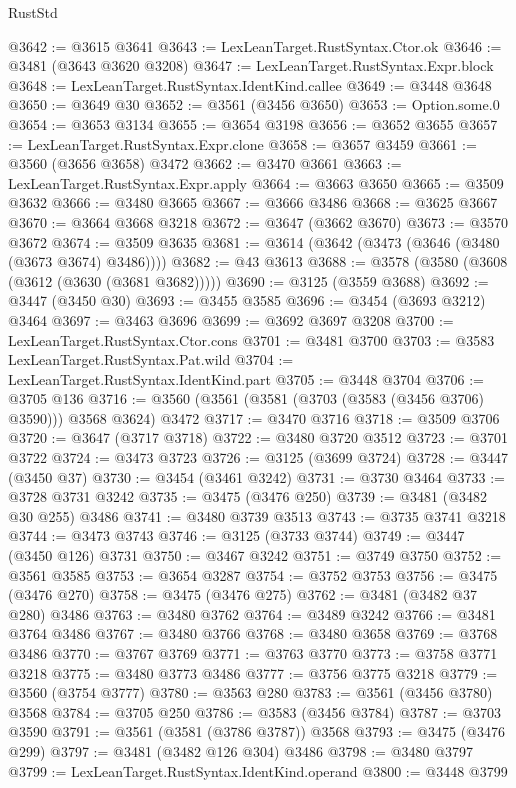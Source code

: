 \begin{lexlean}{RustStd}
\begin{coremodule}
{\begin{coremodule}
{{{{{{{{{{{{{{{{{{{{{{{{{{{{{{{{{{{{{{{{{{{{{@3642 := @3615 @3641
@3643 := LexLeanTarget.RustSyntax.Ctor.ok
@3646 := @3481 (@3643 @3620 @3208)
@3647 := LexLeanTarget.RustSyntax.Expr.block
@3648 := LexLeanTarget.RustSyntax.IdentKind.callee
@3649 := @3448 @3648
@3650 := @3649 @30
@3652 := @3561 (@3456 @3650)
@3653 := Option.some.{0}
@3654 := @3653 @3134
@3655 := @3654 @3198
@3656 := @3652 @3655
@3657 := LexLeanTarget.RustSyntax.Expr.clone
@3658 := @3657 @3459
@3661 := @3560 (@3656 @3658) @3472
@3662 := @3470 @3661
@3663 := LexLeanTarget.RustSyntax.Expr.apply
@3664 := @3663 @3650
@3665 := @3509 @3632
@3666 := @3480 @3665
@3667 := @3666 @3486
@3668 := @3625 @3667
@3670 := @3664 @3668 @3218
@3672 := @3647 (@3662 @3670)
@3673 := @3570 @3672
@3674 := @3509 @3635
@3681 := @3614 (@3642 (@3473 (@3646 (@3480 (@3673 @3674) @3486))))
@3682 := @43 @3613
@3688 := @3578 (@3580 (@3608 (@3612 (@3630 (@3681 @3682)))))
@3690 := @3125 (@3559 @3688)
@3692 := @3447 (@3450 @30)
@3693 := @3455 @3585
@3696 := @3454 (@3693 @3212) @3464
@3697 := @3463 @3696
@3699 := @3692 @3697 @3208
@3700 := LexLeanTarget.RustSyntax.Ctor.cons
@3701 := @3481 @3700
@3703 := @3583 LexLeanTarget.RustSyntax.Pat.wild
@3704 := LexLeanTarget.RustSyntax.IdentKind.part
@3705 := @3448 @3704
@3706 := @3705 @136
@3716 := @3560 (@3561 (@3581 (@3703 (@3583 (@3456 @3706) @3590))) @3568 @3624) @3472
@3717 := @3470 @3716
@3718 := @3509 @3706
@3720 := @3647 (@3717 @3718)
@3722 := @3480 @3720 @3512
@3723 := @3701 @3722
@3724 := @3473 @3723
@3726 := @3125 (@3699 @3724)
@3728 := @3447 (@3450 @37)
@3730 := @3454 (@3461 @3242)
@3731 := @3730 @3464
@3733 := @3728 @3731 @3242
@3735 := @3475 (@3476 @250)
@3739 := @3481 (@3482 @30 @255) @3486
@3741 := @3480 @3739 @3513
@3743 := @3735 @3741 @3218
@3744 := @3473 @3743
@3746 := @3125 (@3733 @3744)
@3749 := @3447 (@3450 @126) @3731
@3750 := @3467 @3242
@3751 := @3749 @3750
@3752 := @3561 @3585
@3753 := @3654 @3287
@3754 := @3752 @3753
@3756 := @3475 (@3476 @270)
@3758 := @3475 (@3476 @275)
@3762 := @3481 (@3482 @37 @280) @3486
@3763 := @3480 @3762
@3764 := @3489 @3242
@3766 := @3481 @3764 @3486
@3767 := @3480 @3766
@3768 := @3480 @3658
@3769 := @3768 @3486
@3770 := @3767 @3769
@3771 := @3763 @3770
@3773 := @3758 @3771 @3218
@3775 := @3480 @3773 @3486
@3777 := @3756 @3775 @3218
@3779 := @3560 (@3754 @3777)
@3780 := @3563 @280
@3783 := @3561 (@3456 @3780) @3568
@3784 := @3705 @250
@3786 := @3583 (@3456 @3784)
@3787 := @3703 @3590
@3791 := @3561 (@3581 (@3786 @3787)) @3568
@3793 := @3475 (@3476 @299)
@3797 := @3481 (@3482 @126 @304) @3486
@3798 := @3480 @3797
@3799 := LexLeanTarget.RustSyntax.IdentKind.operand
@3800 := @3448 @3799
}}}}}}}}}}}}}}}}}}}}}}}}}}}}}}}}}}}}}}}}}}}}}
\end{coremodule}}
\end{coremodule}
\end{lexlean}
